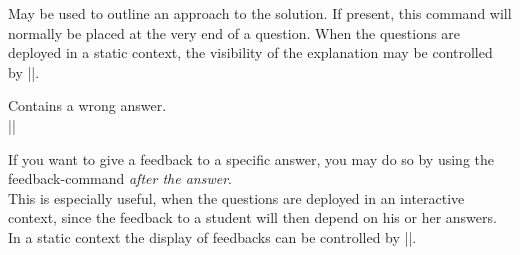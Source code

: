\documentclass[a4paper,10pt]{ltxdoc}
\begin{document}


\DescribeMacro{\explanation} May be used to outline an approach to the 
solution. If present, this command will normally be placed at the very end of
a question. When the questions are deployed in a static context, the
visibility of the explanation may be controlled by |\hidesolution|.

\DescribeMacro{\false} Contains a wrong answer.\\
||


\DescribeMacro{\feedback} If you want to give a feedback to a specific answer,
you may do so by using the feedback-command \emph{after the
answer}.\\ This is especially useful, when the questions are deployed
in an interactive context, since the feedback to a student will then
depend on his or her answers. In a static context the display of feedbacks can
be controlled by |\hidesolution|.



\end{document}
